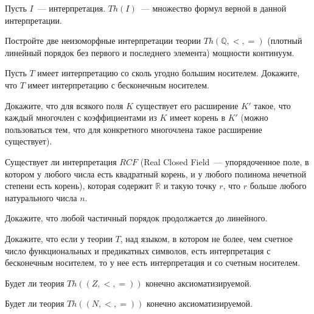 
Пусть $I$~--- интерпретация. $Th(I)$~--- множество формул верной в
данной интерпретации.


\begin{task}
    Постройте две неизоморфные интерпретации теории $Th(\mathbb{Q}, <, =)$ (плотный линейный порядок без первого и последнего
    элемента) мощности континуум.
\end{task}


\begin{task}
    Пусть $T$ имеет интерпретацию со сколь угодно большим носителем. Докажите, что $T$ имеет интерпретацию с бесконечным
	носителем.
\end{task}

\begin{task}
    Докажите, что для всякого поля $K$ существует его расширение $K'$ такое, что каждый многочлен с коэффициентами из $K$ имеет
    корень в $K'$ (можно пользоваться тем, что для конкретного многочлена такое расширение существует).
\end{task}

\begin{task}
  	Существует ли интерпретация $RCF$ (Real Closed Field~--- упорядоченное поле, в котором у любого числа есть квадратный корень,
    и у любого полинома нечетной степени есть корень), которая содержит $\mathbb{R}$ и такую точку $r$, что $r$ больше любого
    натурального числа $n$.
\end{task}


\begin{task}
    Докажите, что любой частичный порядок продолжается до линейного.
\end{task}

\begin{task}
    Докажите, что если у теории $T$, над языком, в котором не более, чем счетное число функциональных и предикатных символов, есть
    интерпретация с бесконечным носителем, то у нее есть интерпретация и со счетным носителем.
\end{task}




\begin{task}
    Будет ли теория $Th((Z, <, =))$ конечно аксиоматизируемой.
\end{task}

\begin{task}
    Будет ли теория $Th((N, <, =))$ конечно аксиоматизируемой.
\end{task}


